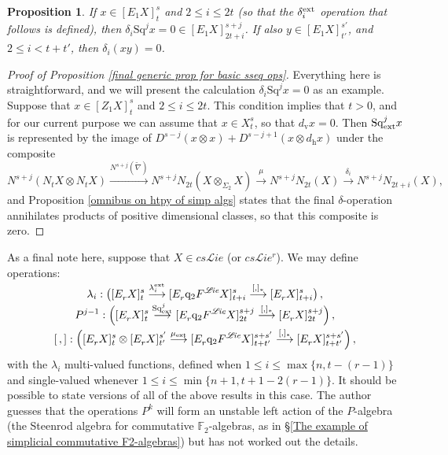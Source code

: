 \documentclass[11pt]{amsart} \renewcommand{\baselinestretch}{1.2}
\theoremstyle{plain}
\newtheorem{prop}[thm]{Proposition}
\numberwithin{equation}{section} %
\theoremstyle{plain}
\newtheorem{prop}[thm]{Proposition}
\numberwithin{equation}{chapter} %
\renewcommand{\to}{\longrightarrow}
\newcommand{\scrL}{\mathscr{L}}
\newcommand{\quadgrad}[1]{\mathrm{q}_{#1}}
\newcommand{\Nabla}{\nabla}
\newcommand{\Sq}{\mathrm{Sq}}
\newcommand{\F}{\mathbb{F}}
\newcommand{\liealgs}{{\scrL\!\textit{ie}}}
\newcommand{\restliealgs}{{\scrL\!\textit{ie}^\textit{r}}}
\newcommand{\Ftwo}{\F_2}
\newcommand{\Edownup}[5]{[E_{#1}^{#2}#3]^{#4}_{#5}}
\newcommand{\EZdownup}[5]{[Z^{#2}_{#1}#3]^{#4}_{#5}}
\newcommand{\dver}{_\mathrm{v}}
\newcommand{\dhor}{_\mathrm{h}}
\begin{document}
\begin{second quadrant homotopy sseq operations}
\begin{prop}
If $x\in \Edownup{1}{}{X}{s}{t}$ and $2\leq i \leq 2t$ (so that the $\delta^\textup{ext}_i$ operation that follows is defined), then $\delta_i\Sq^jx=0\in \Edownup{1}{}{X}{s+j}{2t+i}$. If also $y\in \Edownup{1}{}{X}{s'}{t'}$, and $2\leq i <t+t'$, then $\delta_i(xy)=0$.
\end{prop}
\begin{proof}[Proof of Proposition \ref{final generic prop for basic sseq ops}]
Everything here is straightforward, and we will present the calculation 
$\delta_i\Sq^jx=0$ as an example.
Suppose that $x\in \EZdownup{1}{}{X}{s}{t}$ and $2\leq i\leq 2t$. This condition implies that $t>0$, and for our current purpose we can assume that $x\in X^s_t$, so that $d\dver x=0$.  Then $\Sq^j_\textup{ext}x$ is represented by the image of $D^{s-j}(x\otimes x)+D^{s-j+1}(x\otimes d\dhor x)$ under the composite
\[N^{s+j}(N_tX\otimes N_tX)\overset{N^{s+j}(\widetilde{\Nabla})}{\to}N^{s+j}N_{2t}(X\otimes_{\Sigma_2} X)\overset{\mu}{\to}N^{s+j}N_{2t}(X)\overset{\delta_i}{\to}N^{s+j}N_{2t+i}(X),\]
and Proposition \ref{omnibus on htpy of simp algs} states that the final $\delta$-operation annihilates products of positive dimensional classes, so that this composite is zero.
\end{proof}

As a final note here, suppose that $X\in cs\liealgs$ (or $cs\restliealgs$). We may define operations:
\begin{gather*}
\lambda_i:\left(\Edownup{r}{}{X}{s}{t} \smash{{}\overset{\lambda_i^\textup{ext}}{\to}{}} \Edownup{r}{}{\quadgrad{2}F^\liealgs X}{s}{t+i}\smash{{}\overset{[,]_*}{\to} {}}
\Edownup{r}{}{X}{s}{t+i}\right),
\\
P^{j-1}:\left(\Edownup{r}{}{X}{s}{t}   \smash{{}\overset{\Sq^j_\textup{ext}}{\to}{}} \Edownup{r}{}{\quadgrad{2}F^\liealgs X}{s+j}{2t}\smash{{}\overset{[,]_*}{\to} {}}
\Edownup{r}{}{X}{s+j}{2t}\right),\\
[\,,]:\left(\Edownup{r}{}{X}{s}{t}\otimes \Edownup{r}{}{X}{s'}{t'}\smash{{}\overset{\mu_\textup{ext}}{\to}{}} \Edownup{r}{}{\quadgrad{2}F^\liealgs X}{s+s'}{t+t'}\smash{{}\overset{[,]_*}{\to} {}}
\Edownup{r}{}{X}{s+s'}{t+t'}\right),
\end{gather*}
with the $\lambda_i$  multi-valued functions,  defined when $1\leq i\leq \max\{n,t-(r-1)\}$ %
and single-valued whenever $1\leq i\leq\min\{n+1,t+1-2(r-1)\}$.
It should be possible to state versions of all of the above results in this case. The author guesses that the operations $P^{k}$ will form an unstable left action of the $P$-algebra (the Steenrod algebra for commutative $\Ftwo$-algebras, as in \S\ref{The example of simplicial commutative F2-algebras}) but has not worked out the details.


\end{second quadrant homotopy sseq operations}
\end{document}
